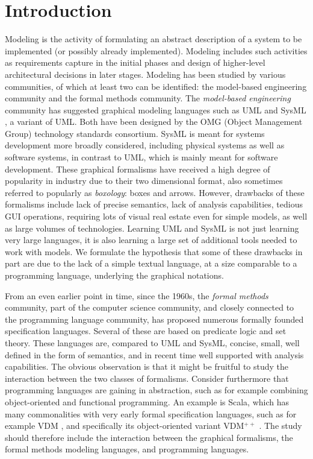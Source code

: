 \section{Introduction}
\label{sec:introduction}

Modeling is the activity of formulating an abstract description of a
system to be implemented (or possibly already implemented). Modeling
includes such activities as requirements capture in the initial phases
and design of higher-level architectural decisions in later
stages. Modeling has been studied by various communities, of which at
least two can be identified: the model-based engineering community and
the formal methods community. The {\em model-based engineering}
community has suggested graphical modeling languages such as UML
\cite{uml} and SysML \cite{sysml}, a variant of UML.  Both have been
designed by the OMG (Object Management Group) technology standards
consortium. SysML is meant for systems development more broadly
considered, including physical systems as well as software systems, in
contrast to UML, which is mainly meant for software development. These
graphical formalisms have received a high degree of popularity in
industry due to their two dimensional format, also sometimes referred
to popularly as {\em boxology}: boxes and arrows. However, drawbacks
of these formalisms include lack of precise semantics, lack of
analysis capabilities, tedious GUI operations, requiring lots
of visual real estate even for simple models, as well as large volumes
of technologies. Learning UML and SysML is not just learning very
large languages, it is also learning a large set of additional tools
needed to work with models. We formulate the hypothesis that some of these
drawbacks in part are due to the lack of a simple textual language, at
a size comparable to a programming language, underlying the
graphical notations.

From an even earlier point in time, since the 1960s, the {\em
  formal methods} community, part of the computer science community,
and closely connected to the programming language community, has
proposed numerous formally founded specification languages. Several of
these are based on predicate logic and set theory. These languages
are, compared to UML and SysML, concise, small, well defined in the
form of semantics, and in recent time well supported with analysis
capabilities. The obvious observation is that it might be fruitful to
study the interaction between the two classes of formalisms. Consider
furthermore that programming languages are gaining in abstraction,
such as for example combining object-oriented and functional
programming. An example is Scala, which has many commonalities with very early formal
specification languages, such as for example VDM \cite{vdm78}, and
specifically its object-oriented variant VDM$^{++}$
\cite{vdmplusplus05}.  The study should therefore include the
interaction between the graphical formalisms, the formal methods
modeling languages, and programming languages.

